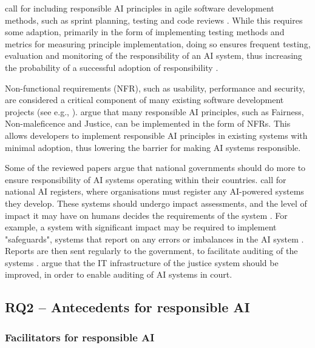 \textcite[p.~104]{Lu_2022} call for including responsible AI principles in agile software development methods, such as sprint planning, testing and code reviews \parencite{Dybå_2008_agile}. While this requires some adaption, primarily in the form of implementing testing methods and metrics for measuring principle implementation, doing so ensures frequent testing, evaluation and monitoring of the responsibility of an AI system, thus increasing the probability of a successful adoption of responsibility \parencite{Jobin_2019,Rakova_2021,Nauck_2019}.

Non-functional requirements (NFR), such as usability, performance and security, are considered a critical component of many existing software development projects (see e.g., \cite{Chung_2009_NFR,Glinz_2007_NFR,Khatter_2013_NFR}). \textcite{Lu_2022} argue that many responsible AI principles, such as Fairness, Non-maleficence and Justice, can be implemented in the form of NFRs. This allows developers to implement responsible AI principles in existing systems with minimal adoption, thus lowering the barrier for making AI systems responsible.

Some of the reviewed papers argue that national governments should do more to ensure responsibility of AI systems operating within their countries. \textcite{Chen_2020,Brand_2022} call for national AI registers, where organisations must register any AI-powered systems they develop. These systems should undergo impact assessments, and the level of impact it may have on humans decides the requirements of the system \parencite{Brand_2022}. For example, a system with significant impact may be required to implement "safeguards", systems that report on any errors or imbalances in the AI system \parencite{Chen_2020}. Reports are then sent regularly to the government, to facilitate auditing of the systems \parencite{Brand_2022,Chen_2020}. \textcite{Floridi_2018} argue that the IT infrastructure of the justice system should be improved, in order to enable auditing of AI systems in court.



\subsection{RQ2 -- Antecedents for responsible AI}
\label{sec:results-rq2:antecedents}

\subsubsection{Facilitators for responsible AI}

